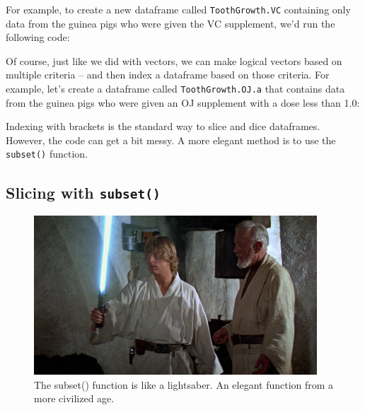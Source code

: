 \documentclass[]{book}
\newenvironment{Shaded}{\begin{snugshade}}{\end{snugshade}}
\newcommand{\DecValTok}[1]{\textcolor[rgb]{0.00,0.00,0.81}{{#1}}}
\newcommand{\StringTok}[1]{\textcolor[rgb]{0.31,0.60,0.02}{{#1}}}
\newcommand{\CommentTok}[1]{\textcolor[rgb]{0.56,0.35,0.01}{\textit{{#1}}}}
\newcommand{\NormalTok}[1]{{#1}}
\theoremstyle{definition}
\theoremstyle{definition}
\theoremstyle{remark}
\begin{document}
For example, to create a new dataframe called \texttt{ToothGrowth.VC}
containing only data from the guinea pigs who were given the VC
supplement, we'd run the following code:

\begin{Shaded}
\end{Shaded}

Of course, just like we did with vectors, we can make logical vectors
based on multiple criteria -- and then index a dataframe based on those
criteria. For example, let's create a dataframe called
\texttt{ToothGrowth.OJ.a} that contains data from the guinea pigs who
were given an OJ supplement with a dose less than 1.0:

\begin{Shaded}
\end{Shaded}

Indexing with brackets is the standard way to slice and dice dataframes.
However, the code can get a bit messy. A more elegant method is to use
the \texttt{subset()} function.

\subsection{\texorpdfstring{Slicing with
\texttt{subset()}}{Slicing with subset()}}\label{slicing-with-subset}

\begin{figure}

{\centering \includegraphics[width=400px]{images/saber} 

}

\caption{The subset() function is like a lightsaber. An elegant function from a more civilized age.}\label{fig:unnamed-chunk-200}
\end{figure}
\end{document}
